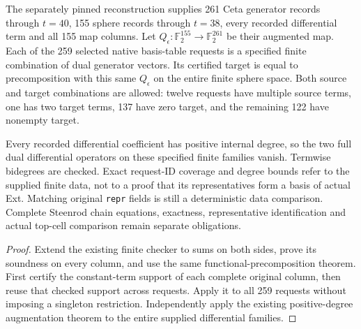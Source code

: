 \begin{lemma}
  \label{lem:lin-naturality-batch40-cochains}
  \leanok
  The separately pinned reconstruction supplies 261 Ceta generator records
  through $t=40$, 155 sphere records through $t=38$, every recorded
  differential term and all 155 map columns. Let
  $Q_\epsilon:\mathbb F_2^{155}\to\mathbb F_2^{261}$ be their augmented
  map. Each of the 259 selected native basis-table requests is a specified
  finite combination of dual generator vectors. Its certified target is
  equal to precomposition with this same $Q_\epsilon$ on the entire finite
  sphere space. Both source and target combinations are allowed: twelve
  requests have multiple source terms, one has two target terms, 137 have
  zero target, and the remaining 122 have nonempty target.

  Every recorded differential coefficient has positive internal degree,
  so the two full dual differential operators on these specified finite
  families vanish. Termwise bidegrees are checked. Exact request-ID coverage
  and degree bounds refer to the supplied finite data, not to a proof that
  its representatives form a basis of actual Ext. Matching original
  \texttt{repr} fields is still a deterministic data comparison. Complete
  Steenrod chain equations, exactness, representative identification and
  actual top-cell comparison remain separate obligations.
\end{lemma}
\begin{proof}
  \leanok
  Extend the existing finite checker to sums on both sides, prove its
  soundness on every column, and use the same functional-precomposition
  theorem. First certify the constant-term support of each complete
  original column, then reuse that checked support across requests.
  Apply it to all 259 requests without imposing a singleton restriction. Independently apply the existing positive-degree
  augmentation theorem to the entire supplied differential families.
\end{proof}

